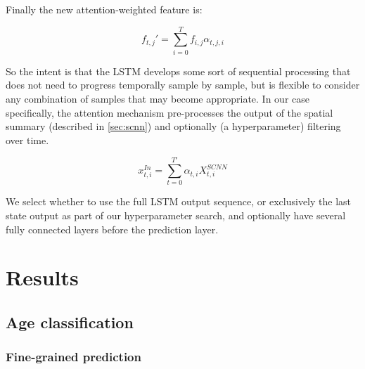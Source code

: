 \documentclass[fleqn,10pt]{wlscirep}
\begin{document}
Finally the new attention-weighted feature is: 

\begin{equation} \label{eq:attn}
    f_{t,j}' = \sum_{i=0}^{T} f_{i,j} \alpha_{t,j,i}
  \end{equation}

So the intent is that the LSTM develops some sort of sequential processing that does not need to progress temporally sample by sample, but is flexible to consider any combination of samples that may become appropriate. In our case specifically, the attention mechanism pre-processes the output of the spatial summary (described in \ref{sec:scnn}) and optionally (a hyperparameter) filtering over time.

\begin{equation}
  x_{t,i}^{In} = \sum_{t=0}^{T'} \alpha_{t,i} X_{t,i}^{SCNN}
\end{equation}

We select whether to use the full LSTM output sequence, or exclusively the last state output as part of our hyperparameter search, and optionally have several fully connected layers before the prediction layer.

\section*{Results}

\subsection*{Age classification}

\subsubsection*{Fine-grained prediction}
\end{document}
